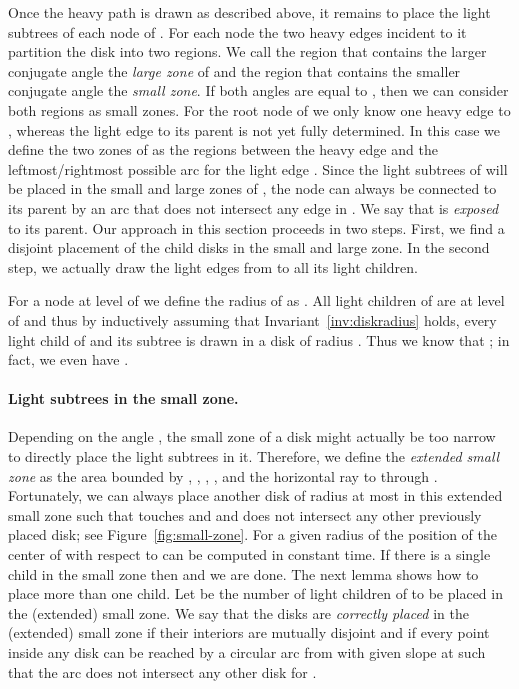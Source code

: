 \documentclass[11pt]{article}
\newcommand{\highlight}[1]{{\itshape #1}}
\begin{document}
Once the heavy path  is drawn as described above, it remains to
place the light subtrees of each node  of . For each node
 the two heavy edges incident to it partition the disk  into
two regions. We call the region that contains the larger conjugate
angle the \highlight{large zone} of  and the region that contains the
smaller conjugate angle the \highlight{small zone}. 
If both angles are equal to , then we can consider both regions as small zones.
For the root node  of  we only know one heavy edge to , whereas the light edge to its parent  is not yet fully determined. 
In this case we define the two zones of  as the regions between the heavy edge and the leftmost/rightmost possible arc for the light edge .
Since the light subtrees of  will be placed in the small and large zones of , the node  can always be connected to its parent  by an arc that does not intersect any edge in .
We say that  is \emph{exposed} to its parent.
Our approach in this section proceeds in two steps. 
First, we find a disjoint placement of the child disks in the small and large zone. 
In the second step, we actually draw the light edges from  to all its light children.

For a node  at level  of  we define the radius  of
 as . All light children of  are at level  of  and
thus by inductively assuming that Invariant~\ref{inv:diskradius} holds, every light child  of  and its subtree is drawn in a
disk of radius . Thus we know that
; in fact, we even have .


\paragraph{Light subtrees in the small zone.}

Depending on the angle , the small zone of a disk 
might actually be too narrow to directly place the light subtrees in
it. 
Therefore, we define the \emph{extended small zone} as the area bounded by , , , , and the horizontal ray to  through .
Fortunately, we can always place another disk  of radius at most  in this extended small zone such that  touches  and 
and does not intersect any other previously placed disk; see
Figure~\ref{fig:small-zone}. For a given radius of  the position of the center of  with respect to  can be computed in constant time. If there is a single child  in the
small zone then  and we are done. The next lemma shows how
to place more than one child. 
Let  be the number of light children of  to be placed in the (extended) small zone.
We say that the disks  are \emph{correctly placed} in the (extended) small zone if their interiors are mutually disjoint and if every point inside any disk  can be reached by a circular arc from  with given slope at  such that the arc does not intersect any other disk  for .
\end{document}
